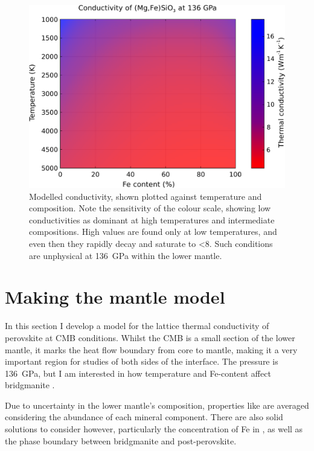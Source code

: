 \begin{figure}[h!]
  \includegraphics[width=\linewidth]{Figures/K_over_T_over_X.png}
  \caption{Modelled conductivity, shown plotted against temperature and composition. Note the sensitivity of the colour scale, showing low conductivities as dominant at high temperatures and intermediate compositions. High values are found only at low temperatures, and even then they rapidly decay and saturate to <8\wmk. Such conditions are unphysical at 136~GPa within the lower mantle.}
  \label{fig:kappa-temp-comp_01}
\end{figure}



\section{Making the mantle model}

In this section I develop a model for the lattice thermal conductivity of \mgfesios perovskite at CMB conditions. Whilst the CMB is a small section of the lower mantle, it marks the heat flow boundary from core to mantle, making it a very important region for studies of both sides of the interface. The pressure is 136~GPa, but I am interested in how temperature and Fe-content affect bridgmanite \tc.

Due to uncertainty in the lower mantle's composition, properties like \tcs are averaged considering the abundance of each mineral component. There are also solid solutions to consider however, particularly the concentration of Fe in \mgsio, as well as the phase boundary between bridgmanite and \mgsios post-perovskite. 

